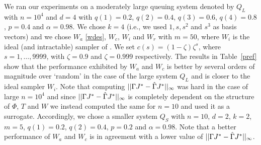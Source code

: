 We ran our experiments on a moderately large queuing system denoted by $Q_L$ with $n=10^4$ and $d=4$ with $q(1)=0.2$, $q(2)=0.4$, $q(3)=0.6$, $q(4)=0.8$, $p=0.4$ and $\alpha=0.98$. We chose $k=4$ (i.e., we used $1, s,s^2$ and $s^3$ as basis vectors) and we chose $W_a$ \eqref{wdes}, $W_c$, $W_i$ and $W_r$ with $m=50$, where $W_i$ is the ideal 
(and intractable) sampler of \citep{CS}. 
We set $c(s)=(1-\zeta) \zeta^s$, where $s=1,\ldots,9999$, with $\zeta=0.9$ and $\zeta=0.999$ respectively. The results in Table~\ref{pref} show that the performance exhibited by $W_a$ and $W_c$ is better by several orders of magnitude over `random' in the case of the large system $Q_L$ and is closer to the ideal sampler $W_i$. Note that computing $||\Gamma J^*-\hat{\Gamma} J^*||_\infty$ was hard in the case of large $n=10^4$ and since $||\Gamma J^*-\hat{\Gamma} J^*||_\infty$ is completely dependent on the structure of $\Phi$, $T$ and $W$ we instead computed the same for $n=10$ and used it as a surrogate. Accordingly, we chose a smaller system $Q_S$ with $n=10$, $d=2$, $k=2$, $m=5$, $q(1)=0.2$, $q(2)=0.4$, $p=0.2$ and $\alpha=0.98$. Note that a better performance of $W_a$ and $W_c$ is in agreement with a lower value of $||\Gamma J^*-\hat{\Gamma} J^*||_\infty$.
\FloatBarrier
\begin{table}[H]
\begin{center}
\end{center}
\caption{Shows values of Error Terms for $Q_L$.}
\label{pref}
\end{table}

